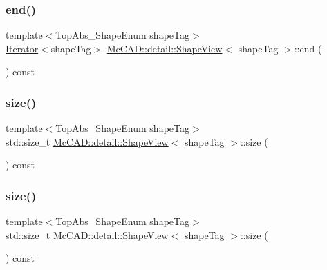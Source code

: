 \subsubsection{\texorpdfstring{end()}{end()}\hspace{0.1cm}{\footnotesize\ttfamily [2/2]}}
{\footnotesize\ttfamily template$<$Top\+Abs\+\_\+\+Shape\+Enum shape\+Tag$>$ \\
\hyperlink{classMcCAD_1_1detail_1_1Iterator}{Iterator}$<$shape\+Tag$>$ \hyperlink{classMcCAD_1_1detail_1_1ShapeView}{Mc\+C\+A\+D\+::detail\+::\+Shape\+View}$<$ shape\+Tag $>$\+::end (\begin{DoxyParamCaption}{ }\end{DoxyParamCaption}) const}

\mbox{\label{classMcCAD_1_1detail_1_1ShapeView_a664f15209591585832c5438c4aff42ca}} 
\subsubsection{\texorpdfstring{size()}{size()}\hspace{0.1cm}{\footnotesize\ttfamily [1/2]}}
{\footnotesize\ttfamily template$<$Top\+Abs\+\_\+\+Shape\+Enum shape\+Tag$>$ \\
std\+::size\+\_\+t \hyperlink{classMcCAD_1_1detail_1_1ShapeView}{Mc\+C\+A\+D\+::detail\+::\+Shape\+View}$<$ shape\+Tag $>$\+::size (\begin{DoxyParamCaption}{ }\end{DoxyParamCaption}) const}

\mbox{\label{classMcCAD_1_1detail_1_1ShapeView_a664f15209591585832c5438c4aff42ca}} 
\subsubsection{\texorpdfstring{size()}{size()}\hspace{0.1cm}{\footnotesize\ttfamily [2/2]}}
{\footnotesize\ttfamily template$<$Top\+Abs\+\_\+\+Shape\+Enum shape\+Tag$>$ \\
std\+::size\+\_\+t \hyperlink{classMcCAD_1_1detail_1_1ShapeView}{Mc\+C\+A\+D\+::detail\+::\+Shape\+View}$<$ shape\+Tag $>$\+::size (\begin{DoxyParamCaption}{ }\end{DoxyParamCaption}) const}



